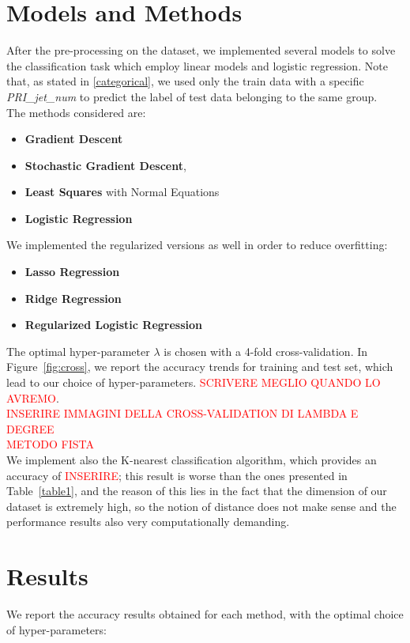 \documentclass[10pt,conference,compsocconf]{IEEEtran}
\begin{document}
\section{Models and Methods}
\label{models}
After the pre-processing on the dataset, we implemented several models to solve the classification task which employ linear models and logistic regression.
Note that, as stated in \ref{categorical}, we used only the train data with a specific \emph{PRI\_jet\_num} to predict the label of test data belonging to the same group. \\
The methods considered are:
\begin{itemize}
    \item \textbf{Gradient Descent}
    \item \textbf{Stochastic Gradient Descent}, 
    \item \textbf{Least Squares} with Normal Equations
    \item \textbf{Logistic Regression}
    \end{itemize}
We implemented the regularized versions as well in order to reduce overfitting:
\begin{itemize}
\item \textbf{Lasso Regression}
\item \textbf{Ridge Regression}
\item \textbf{Regularized Logistic Regression}
\end{itemize}

The optimal hyper-parameter $\lambda$ is chosen with a 4-fold cross-validation. In Figure~\ref{fig:cross}, we report the accuracy trends for training and test set, which lead to our choice of hyper-parameters. \textcolor{red}{SCRIVERE MEGLIO QUANDO LO AVREMO}.
\\
\newline
\textcolor{red}{INSERIRE IMMAGINI DELLA CROSS-VALIDATION DI LAMBDA E DEGREE}
\\
\textcolor{red}{METODO FISTA}
\\
We implement also the K-nearest classification algorithm, which provides an accuracy of \textcolor{red}{INSERIRE}; this result is worse than the ones presented in Table~\ref{table1}, and the reason of this lies in the fact that the dimension of our dataset is extremely high, so the notion of distance does not make sense and the performance results also very computationally demanding.
\section{Results}
\label{results}
We report the accuracy results obtained for each method, with the optimal choice of hyper-parameters: \\
\end{document}
